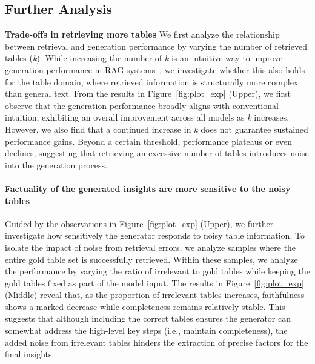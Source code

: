 \subsection{Further Analysis}
\textbf{Trade-offs in retrieving more tables} \quad
We first analyze the relationship between retrieval and generation performance by varying the number of retrieved tables (\textit{k}).
While increasing the number of \textit{k} is an intuitive way to improve generation performance in RAG systems~\citep{kim2024is}, we investigate whether this also holds for the table domain, where retrieved information is structurally more complex than general text.
From the results in Figure~\ref{fig:plot_exp} (Upper), we first observe that the generation performance broadly aligns with conventional intuition, exhibiting an overall improvement across all models as \textit{k} increases.  
However, we also find that a continued increase in \textit{k} does not guarantee sustained performance gains. Beyond a certain threshold, performance plateaus or even declines, suggesting that retrieving an excessive number of tables introduces noise into the generation process.

\paragraph{Factuality of the generated insights are more sensitive to the noisy tables}
Guided by the observations in Figure~\ref{fig:plot_exp} (Upper), we further investigate how sensitively the generator responds to noisy table information. To isolate the impact of noise from retrieval errors, we analyze samples where the entire gold table set is successfully retrieved.
Within these samples, we analyze the performance by varying the ratio of irrelevant to gold tables while keeping the gold tables fixed as part of the model input.
The results in Figure~\ref{fig:plot_exp} (Middle) reveal that, as the proportion of irrelevant tables increases, faithfulness shows a marked decrease while completeness remains relatively stable. 
This suggests that although including the correct tables ensures the generator can somewhat address the high-level key steps (i.e., maintain completeness), the added noise from irrelevant tables hinders the extraction of precise factors for the final insights.

